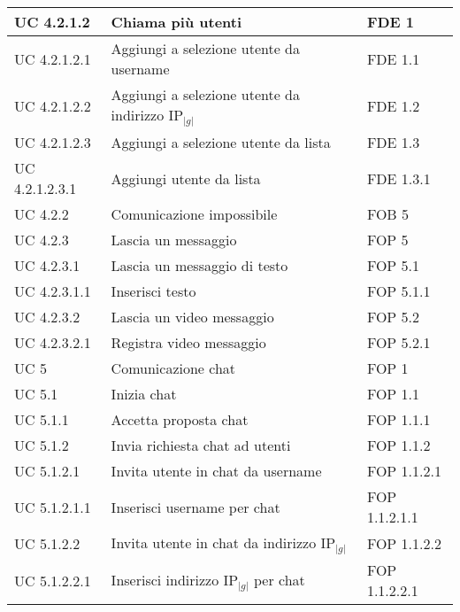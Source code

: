 \begin{longtable}{p{} p{} p{} }
\midrule
UC 4.2.1.2 & Chiama più utenti & FDE 1\\

\midrule
UC 4.2.1.2.1 & Aggiungi a selezione utente da \newline username & FDE 1.1\\

\midrule
UC 4.2.1.2.2 & Aggiungi a selezione utente da \newline indirizzo IP$_{|g|}$ & FDE 1.2\\

\midrule
UC 4.2.1.2.3 & Aggiungi a selezione utente da lista & FDE 1.3\\
\midrule
UC 4.2.1.2.3.1 & Aggiungi utente da lista & FDE 1.3.1\\

\midrule
UC 4.2.2 & Comunicazione impossibile & FOB 5\\

\midrule
UC 4.2.3 & Lascia un messaggio & FOP 5\\

\midrule
UC 4.2.3.1 & Lascia un messaggio di testo & FOP 5.1\\
\midrule
UC 4.2.3.1.1 & Inserisci testo & FOP 5.1.1\\

\midrule
UC 4.2.3.2 & Lascia un video messaggio & FOP 5.2\\
\midrule
UC 4.2.3.2.1 & Registra video messaggio & FOP 5.2.1\\


\midrule
UC 5 & Comunicazione chat & FOP 1\\

\midrule
UC 5.1 & Inizia chat & FOP 1.1\\

\midrule
UC 5.1.1 & Accetta proposta chat & FOP 1.1.1\\

\midrule
UC 5.1.2 & Invia richiesta chat ad utenti & FOP 1.1.2\\
\midrule
UC 5.1.2.1 & Invita utente in chat da username & FOP 1.1.2.1\\
\midrule
UC 5.1.2.1.1 & Inserisci username per chat & FOP 1.1.2.1.1\\

\midrule
UC 5.1.2.2 & Invita utente in chat da indirizzo IP$_{|g|}$ & FOP 1.1.2.2\\
\midrule
UC 5.1.2.2.1 & Inserisci indirizzo IP$_{|g|}$ per chat & FOP 1.1.2.2.1\\


\end{longtable}
